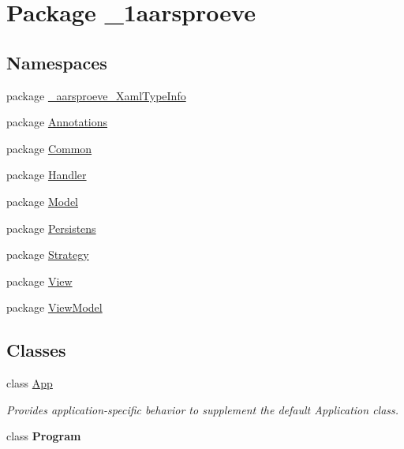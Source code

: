 \hypertarget{namespace__1aarsproeve}{}\section{Package \+\_\+1aarsproeve}
\label{namespace__1aarsproeve}
\subsection*{Namespaces}
\begin{DoxyCompactItemize}
\item 
package \hyperlink{namespace__1aarsproeve_1_1__aarsproeve___xaml_type_info}{\+\_\+aarsproeve\+\_\+\+Xaml\+Type\+Info}
\item 
package \hyperlink{namespace__1aarsproeve_1_1_annotations}{Annotations}
\item 
package \hyperlink{namespace__1aarsproeve_1_1_common}{Common}
\item 
package \hyperlink{namespace__1aarsproeve_1_1_handler}{Handler}
\item 
package \hyperlink{namespace__1aarsproeve_1_1_model}{Model}
\item 
package \hyperlink{namespace__1aarsproeve_1_1_persistens}{Persistens}
\item 
package \hyperlink{namespace__1aarsproeve_1_1_strategy}{Strategy}
\item 
package \hyperlink{namespace__1aarsproeve_1_1_view}{View}
\item 
package \hyperlink{namespace__1aarsproeve_1_1_view_model}{View\+Model}
\end{DoxyCompactItemize}
\subsection*{Classes}
\begin{DoxyCompactItemize}
\item 
class \hyperlink{class__1aarsproeve_1_1_app}{App}
\begin{DoxyCompactList}\small\item\em Provides application-\/specific behavior to supplement the default Application class. \end{DoxyCompactList}\item 
class {\bfseries Program}
\end{DoxyCompactItemize}
